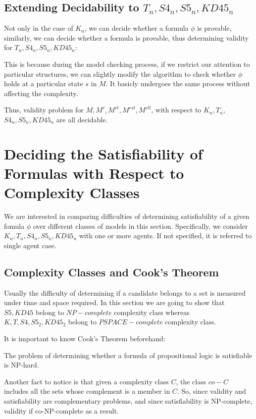 \documentclass{article}
\begin{document}
\subsection{Extending Decidability to $T_n, S4_n, S5_n, KD45_n$}
\par Not only in the case of $K_n$, we can decide whether a formula $\phi$ is provable, similarly, we can decide whether a formula is provable, thus determining validity for $T_n, S4_n, S5_n, KD45_n$:
\par This is because during the model checking process, if we restrict our attention to particular structures, we can slightly modify the algorithm to check whether $\phi$ holds at a particular state $s$ in $M$. It basicly undergoes the same process without affecting the complexity.\\
\par Thus, validity problem for $M,M^r,M^{rt},M^{rst},M^{elt}$, with respect to $K_n, T_n,$\\$S4_n, S5_n, KD45_n$ are all decidable.
\section{Deciding the Satisfiability of Formulas with Respect to Complexity Classes}
\par We are interested in comparing difficulties of determining satisfiability of a given fomula $\phi$ over different classes of models in this section. Specifically, we consider $K_n, T_n, S4_n, S5_n, KD45_n$ with one or more agents. If not specified, it is referred to single agent case.
\subsection{Complexity Classes and Cook's Theorem}
\par Usually the difficulty of determining if a candidate belongs to a set is measured under time and space required. In this section we are going to show that $S5,KD45$ belong to $NP-complete$ complexity class whereas $K,T,S4,S5_2,KD45_2$ belong to $PSPACE-complete$ complexity class. \\
\par It is important to know Cook's Theorem beforehand:
\par The problem of determining whether a formula of propositional logic is satisfiable is NP-hard. \\
\par Another fact to notice is that given a complexity class $C$, the class $co-C$ includes all the sets whose complement is a member in $C$. So, since validity and satisfiability are complementary problems, and since satisfiability is NP-complete, validity if co-NP-complete as a result.
\end{document}
